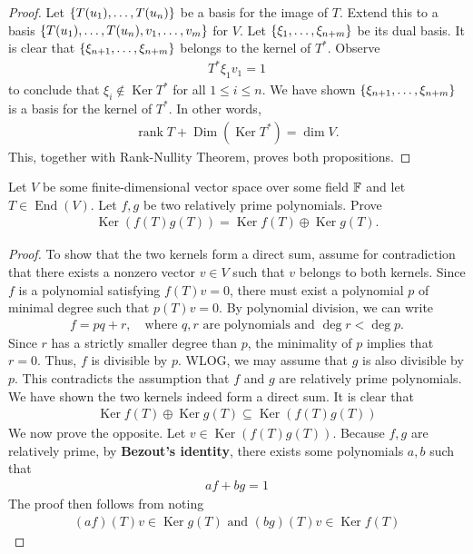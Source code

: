 \documentclass{report}
\begin{document}
\begin{proof}
Let $\left\{ T(u_1),\dots ,T(u_n) \right\}$ be a basis for the image of $T$. Extend this to a basis $\left\{ T(u_1),\dots ,T(u_n),v_1,\dots ,v_m \right\}$ for $V$. Let $\left\{ \xi_1,\dots ,\xi_{n+m} \right\}$ be its dual basis. It is clear that $\left\{ \xi_{n+1},\dots ,\xi_{n+m} \right\}$ belongs to the kernel of $T^*$. Observe  
\begin{align*}
T^*\xi_1v_1 = 1
\end{align*}
to conclude that $\xi_i \not\in \operatorname{Ker}T^*$ for all $1\leq i\leq n$. We have shown $\left\{ \xi_{n+1},\dots ,\xi_{n+m} \right\}$ is a basis for the kernel of $T^*$. In other words,  
\begin{align*}
   \operatorname{rank}T+\operatorname{Dim}(\operatorname{Ker}T^*)= \operatorname{dim}V.
\end{align*}
This, together with Rank-Nullity Theorem, proves both propositions.
\end{proof}
\begin{question}{}{}
Let $V$ be some finite-dimensional vector space over some field $\mathbb{F}$ and let $T \in \operatorname{End}(V)$. Let $f,g$ be two relatively prime polynomials. Prove 
\begin{align*}
\operatorname{Ker}(f(T)g(T))= \operatorname{Ker}f(T)\oplus \operatorname{Ker}g(T).
\end{align*}
\end{question}

\begin{proof}
To show that the two kernels form a direct sum, assume for contradiction that there exists a nonzero vector $v \in V$ such that $v$ belongs to both kernels. Since $f$ is a polynomial satisfying $f(T)v=0$, there must exist a polynomial $p$ of minimal degree such that $p(T)v=0$. By polynomial division, we can write 
\begin{align*}
f = pq + r, \quad \text{where } q, r \text{ are polynomials and } \deg r < \deg p.
\end{align*}
Since $r$ has a strictly smaller degree than $p$, the minimality of $p$ implies that $r = 0$. Thus, $f$ is divisible by $p$. WLOG, we may assume that $g$ is also divisible by $p$. This contradicts the assumption that $f$ and $g$ are relatively prime polynomials. We have shown the two kernels indeed form a direct sum. It is clear that 
\begin{align*}
\operatorname{Ker}f(T)\oplus  \operatorname{Ker}g(T)\subseteq \operatorname{Ker}(f(T)g(T)) 
\end{align*}
We now prove the opposite. Let $v \in \operatorname{Ker}(f(T)g(T))$. Because $f,g$ are relatively prime, by \textbf{Bezout's identity}, there exists some polynomials  $a,b$ such that 
\begin{align*}
af+bg=1
\end{align*}
The proof then follows from noting 
\begin{align*}
  (af)(T)v \in \operatorname{Ker}g(T) \text{ and }(bg)(T)v \in \operatorname{Ker}f(T)
\end{align*}
\end{proof}
\end{document}
